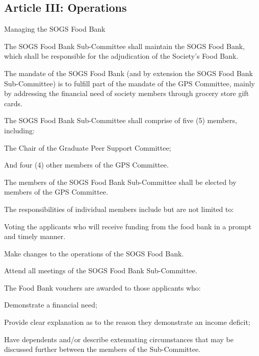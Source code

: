 \subsection{Article III: Operations}
\begin{longenum}[ label*=\thesubsection.\arabic*., align=left] 
\item Managing the SOGS Food Bank
	\begin{longenum}[label*=\arabic*., align=left]	
	\item The SOGS Food Bank Sub-Committee shall maintain the SOGS Food Bank, which shall be responsible for the adjudication of the Society’s Food Bank.
	\item The mandate of the SOGS Food Bank (and by extension the SOGS Food Bank Sub-Committee) is to fulfill part of the mandate of the GPS Committee, mainly by addressing the financial need of society members through grocery store gift cards.
	\item The SOGS Food Bank Sub-Committee shall comprise of five (5) members, including:
		\begin{longenum}[label*=\arabic*., align=left]
		\item The Chair of the Graduate Peer Support Committee;
		\item And four (4) other members of the GPS Committee.
		\end{longenum}
	\item The members of the SOGS Food Bank Sub-Committee shall be elected by members of the GPS Committee.
	\item The responsibilities of individual members include but are not limited to:
		\begin{longenum}[label*=\arabic*., align=left]
		\item Voting the applicants who will receive funding from the food bank in a prompt and timely manner.
		\item Make changes to the operations of the SOGS Food Bank.
		\item Attend all meetings of the SOGS Food Bank Sub-Committee.
		\end{longenum}
	\item The Food Bank vouchers are awarded to those applicants who:
		\begin{longenum}[label*=\arabic*., align=left]	
		\item Demonstrate a financial need;
		\item Provide clear explanation as to the reason they demonstrate an income deficit;
		\item Have dependents and/or describe extenuating circumstances that may be discussed further between the members of the Sub-Committee.			

\end{longenum}
\end{longenum}
\end{longenum}
